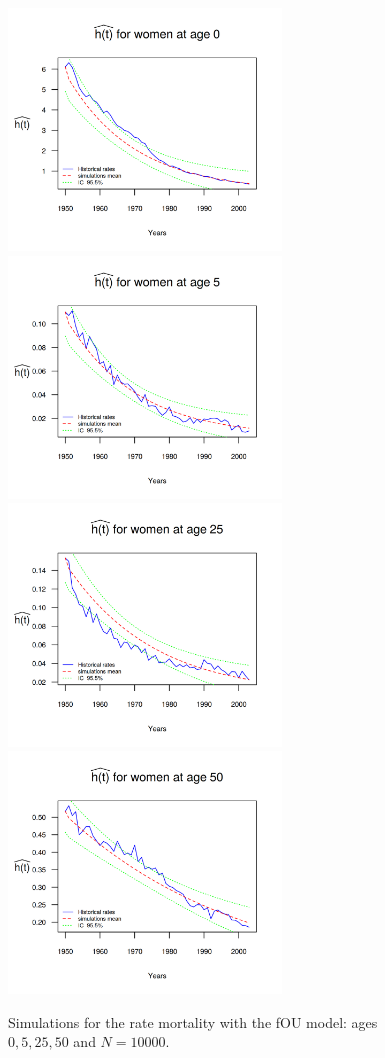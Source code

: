 \documentclass[12pt,reqno]{amsart}
\theoremstyle{definition}
\theoremstyle{remark}
\numberwithin{equation}{section}
\begin{document}
\begin{figure}[H]
\includegraphics[width = 2.85in]{PlotWomen0.png}
\includegraphics[width = 2.85in]{PlotWomen5.png}
\includegraphics[width = 2.85in]{PlotWomen25.png}
\includegraphics[width = 2.85in]{PlotWomen50.png}
\caption{Simulations for the rate mortality with the fOU model: ages $0,5,25,50$ and $N=10000$.}
\label{graph-simu_FOU1}
\end{figure}\vspace*{0.1cm}
\end{document}
